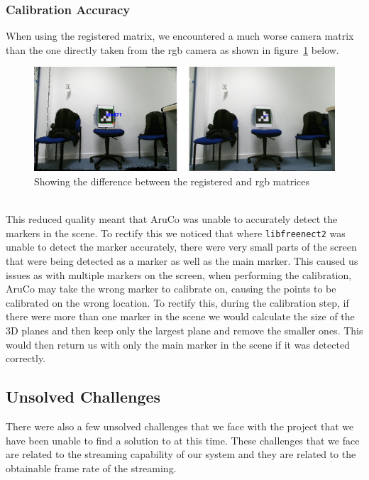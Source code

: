 \documentclass{article}
\begin{document}
\subsubsection{Calibration Accuracy}
When using the registered matrix, we encountered a much worse camera matrix than the one directly taken from the rgb camera as shown in figure~\ref{fig:registeredaccuracy} below.
\begin{figure}[h]
  \centering
  \includegraphics[scale=0.7]{registeredunregisteredview}
  \caption{Showing the difference between the registered and rgb matrices}
  \label{fig:registeredaccuracy}
\end{figure}
\\
This reduced quality meant that AruCo was unable to accurately detect the markers in the scene. To rectify this we noticed that where \texttt{libfreenect2} was unable to detect the marker accurately, there were very small parts of the screen that were being detected as a marker as well as the main marker. This caused us issues as with multiple markers on the screen, when performing the calibration, AruCo may take the wrong marker to calibrate on, causing the points to be calibrated on the wrong location. To rectify this, during the calibration step, if there were more than one marker in the scene we would calculate the size of the 3D planes and then keep only the largest plane and remove the smaller ones. This would then return us with only the main marker in the scene if it was detected correctly.

\subsection{Unsolved Challenges}
There were also a few unsolved challenges that we face with the project that we have been unable to find a solution to at this time. These challenges that we face are related to the streaming capability of our system and they are related to the obtainable frame rate of the streaming.
\end{document}
